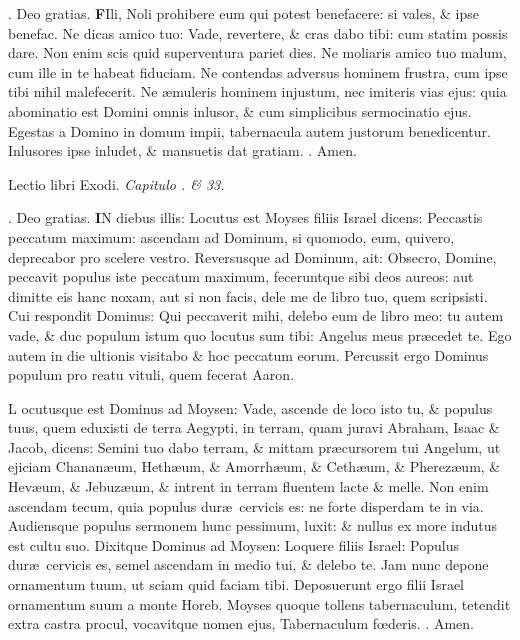\documentclass[letter,11pt]{book}
\makeatletter
\DeclareRobustCommand{\Rbar}{\vers@resp{0pt}{R}}
\newcommand{\vers@resp@sym}{\raisebox{0.2ex}{\rotatebox[origin=c]{-20}{$\m@th\rceil$}}}
\newcommand{\vers@resp}[2]{%
  {\ooalign{\hidewidth\kern#1\vers@resp@sym\hidewidth\cr#2\cr}}%
}%
\def\R{\color{Red} \Rbar . \color{black}}
\makeatother
\begin{document}
\begin{multicols*}{2}
\par \noindent \R Deo gratias.
\lettrine[lines=2]{\bfseries \color{Red} F}{}Ili, Noli prohibere eum qui potest benefacere: si vales, \& ipse benefac. Ne dicas amico tuo: Vade, revertere, \& cras dabo tibi: cum statim possis dare. Non enim scis quid superventura pariet dies. Ne moliaris amico tuo malum, cum ille in te habeat fiduciam. Ne contendas adversus hominem frustra, cum ipse tibi nihil malefecerit. Ne \ae muleris hominem injustum, nec imiteris vias ejus: quia abominatio est Domini omnis inlusor, \& cum simplicibus sermocinatio ejus. Egestas a Domino in domum impii, tabernacula autem justorum benedicentur. Inlusores ipse inludet, \& mansuetis dat gratiam. \R Amen.
\vspace{-.5em} \begin{center} {\color{Red} L}ectio libri Exodi. \itshape Capitulo . \& 33. \color{black} \end{center} \vspace{-.5em}
\par \noindent \R Deo gratias.
\lettrine[lines=2]{\bfseries \color{Red} I}{}N diebus illis: Locutus est Moyses filiis Israel dicens: Peccastis peccatum maximum: ascendam ad Dominum, si quomodo, eum, quivero, deprecabor pro scelere vestro. Reversusque ad Dominum, ait: Obsecro, Domine, peccavit populus iste peccatum maximum, feceruntque sibi deos aureos: aut dimitte eis hanc noxam, aut si non facis, dele me de libro tuo, quem scripsisti. Cui respondit Dominus: Qui peccaverit mihi, delebo eum de libro meo: tu autem vade, \& duc populum istum quo locutus sum tibi: Angelus meus pr\ae cedet te. Ego autem in die ultionis visitabo \& hoc peccatum eorum. Percussit ergo Dominus populum pro reatu vituli, quem fecerat Aaron.
\par \color{Red} L\color{black} ocutusque est Dominus ad Moysen: Vade, ascende de loco isto tu, \& populus tuus, quem eduxisti de terra Aegypti, in terram, quam juravi Abraham, Isaac \& Jacob, dicens: Semini tuo dabo terram, \& mittam pr\ae cursorem tui Angelum, ut ejiciam Chanan\ae um, Heth\ae um, \& Amorrh\ae um, \& Ceth\ae um, \& Pherez\ae um, \& Hev\ae um, \& Jebuz\ae um, \& intrent in terram fluentem lacte \& melle. Non enim ascendam tecum, quia populus dur\ae \ cervicis es: ne forte disperdam te in via. Audiensque populus
sermonem hunc pessimum, luxit: \& nullus ex more indutus est cultu suo. Dixitque Dominus ad Moysen: Loquere filiis Israel: Populus dur\ae \ cervicis es, semel ascendam in medio tui, \& delebo te. Jam nunc depone ornamentum tuum, ut sciam quid faciam tibi. Deposuerunt ergo filii Israel ornamentum suum a monte Horeb. Moyses quoque tollens tabernaculum, tetendit extra castra procul, vocavitque nomen ejus, Tabernaculum f\oe deris. \R Amen.

\end{multicols*}
\end{document}
